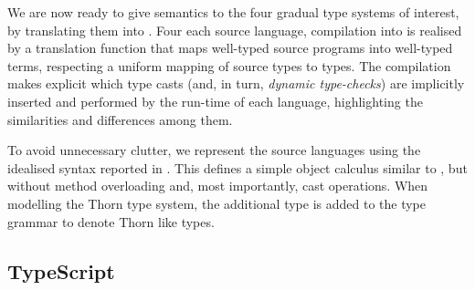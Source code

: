 \documentclass[acmlarge, anonymous, authordraft]{acmart}
\begin{document}
\noindent
We are now ready to give semantics to the four gradual type systems of interest, by translating them into \kafka. 
Four each source language, compilation into \kafka is realised by a translation function that maps well-typed source programs into well-typed \kafka terms, respecting a uniform mapping of source types to \kafka types.  The compilation makes explicit which type casts (and, in turn, \emph{dynamic type-checks}) are implicitly inserted and performed by the run-time of each language, highlighting the similarities and differences among them.   

To avoid unnecessary clutter, we represent the source languages using the idealised syntax reported in .  This defines a simple object calculus similar to \kafka, but without method overloading and, most importantly, cast operations.  When modelling the Thorn type system, the additional type \CW is added to the type grammar to denote Thorn like types. 




%
%
%
%


\subsection{TypeScript}
\end{document}
